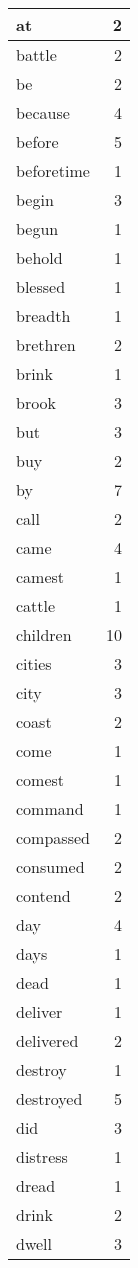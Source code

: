 \begin{center}
\begin{longtable}{l|r}
at & 2 \\ \hline
battle & 2 \\ \hline
be & 2 \\ \hline
because & 4 \\ \hline
before & 5 \\ \hline
beforetime & 1 \\ \hline
begin & 3 \\ \hline
begun & 1 \\ \hline
behold & 1 \\ \hline
blessed & 1 \\ \hline
breadth & 1 \\ \hline
brethren & 2 \\ \hline
brink & 1 \\ \hline
brook & 3 \\ \hline
but & 3 \\ \hline
buy & 2 \\ \hline
by & 7 \\ \hline
call & 2 \\ \hline
came & 4 \\ \hline
camest & 1 \\ \hline
cattle & 1 \\ \hline
children & 10 \\ \hline
cities & 3 \\ \hline
city & 3 \\ \hline
coast & 2 \\ \hline
come & 1 \\ \hline
comest & 1 \\ \hline
command & 1 \\ \hline
compassed & 2 \\ \hline
consumed & 2 \\ \hline
contend & 2 \\ \hline
day & 4 \\ \hline
days & 1 \\ \hline
dead & 1 \\ \hline
deliver & 1 \\ \hline
delivered & 2 \\ \hline
destroy & 1 \\ \hline
destroyed & 5 \\ \hline
did & 3 \\ \hline
distress & 1 \\ \hline
dread & 1 \\ \hline
drink & 2 \\ \hline
dwell & 3 \\ \hline

\end{longtable}
\end{center}
